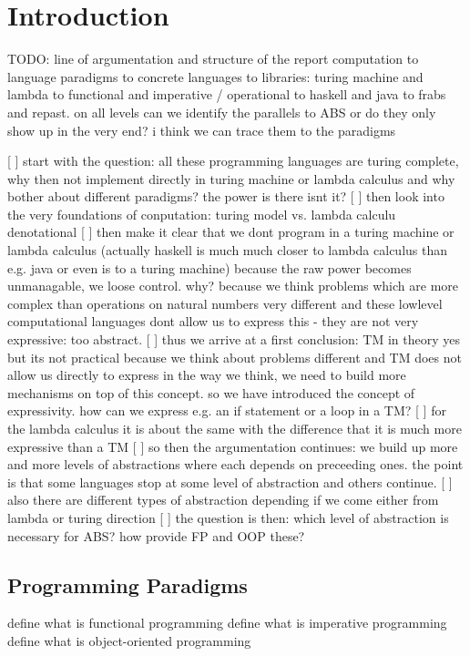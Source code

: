 \chapter{Introduction}

TODO: line of argumentation and structure of the report
computation to language paradigms to concrete languages to libraries: turing machine and lambda to functional and imperative / operational to haskell and java to frabs and repast. on all levels can we identify the parallels to ABS or do they only show up in the very end? i think we can trace them to the paradigms 

[ ] start with the question: all these programming languages are turing complete, why then not implement directly in turing machine or lambda calculus and why bother about different paradigms? the power is there isnt it?
[ ] then look into the very foundations of conputation: turing model vs. lambda calculu denotational
[ ] then make it clear that we dont program in a turing machine or lambda calculus (actually haskell is much much closer to lambda calculus than e.g. java or even is to a turing machine) because the raw power becomes unmanagable, we loose control. why? because we think problems which are more complex than operations on natural numbers very different and these lowlevel computational languages dont allow us to express this - they are not very expressive: too abstract.
[ ] thus we arrive at a first conclusion: TM in theory yes but its not practical because we think about problems different and TM does not allow us directly to express in the way we think, we need to build  more mechanisms on top of this concept. so we have introduced the concept of expressivity. how can we express e.g. an if statement or a loop in a TM? 
[ ] for the lambda calculus it is about the same with the difference that it is much more expressive than a TM
[ ] so then the argumentation continues: we build up more and more levels of abstractions where each depends on preceeding ones. the point is that some languages stop at some level of abstraction and others continue.
[ ] also there are different types of abstraction depending if we come either from lambda or turing direction 
[ ] the question is then: which level of abstraction is necessary for ABS? how provide FP and OOP these?

\section{Programming Paradigms}
define what is functional programming
define what is imperative programming
define what is object-oriented programming

